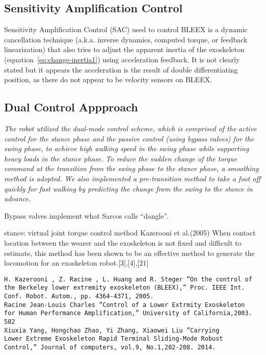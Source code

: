 \documentclass[letterpaper,12pt,fullpage]{article}
\begin{document}
\subsection{Sensitivity Amplification Control}

Sensitivity Amplification Control (SAC) used to control BLEEX
is a dynamic cancellation technique (a.k.a.
inverse dynamics, computed torque, or feedback linearization) that also tries
to adjust the apparent inertia of the exoskeleton (equation~\ref{eq:change-inertia1})
using acceleration feedback. It is not clearly stated but it appears the
acceleration is the result of double differentiating position, as there do not
appear to be velocity sensors on BLEEX.

\subsection{Dual Control Appproach}

{\it The robot utilized the dual-mode control scheme, which is
comprised of the active control for the stance phase and the
passive control (using bypass valves) for the swing phase, to achieve high walking
speed in the swing phase while supporting heavy loads in
the stance phase. To reduce the sudden change of the torque
command at the transition from the swing phase to the stance
phase, a smoothing method is adopted. We also implemented
a pre-transition method to take a foot off quickly for fast
walking by predicting the change from the swing to the stance
in advance.}~\cite{IEEE07222598}

Bypass valves implement what Sarcos calls ``dangle''.

stance: virtual joint torque control method Kazerooni et al.(2005)
When contact location between the wearer and the
exoskeleton is not fixed and difficult to estimate, this method
has been shown to be an effective method to generate the
locomotion for an exoskeleton robot.[3],[4],[21]
\begin{verbatim}
H. Kazerooni , Z. Racine , L. Huang and R. Steger ”On the control of
the Berkeley lower extremity exoskeleton (BLEEX),” Proc. IEEE Int.
Conf. Robot. Autom., pp. 4364-4371, 2005.
Racine Jean-Louis Charles ”Control of a Lower Extrmity Exoskeleton
for Human Performance Amplification,” University of California,2003.
582
Xiuxia Yang, Hongchao Zhao, Yi Zhang, Xiaowei Liu ”Carrying
Lower Extreme Exoskeleton Rapid Terminal Sliding-Mode Robust
Control,” Journal of computers, vol.9, No.1,202-208. 2014.
\end{verbatim}
\end{document}
